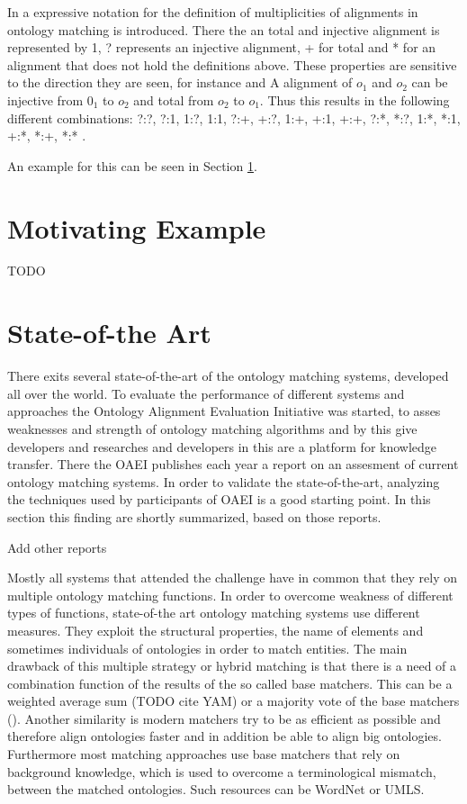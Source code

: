\documentclass[11pt,titlepage,oneside,openany,a4paper]{report}
\begin{document}
In \cite{euzenat2003towards} a expressive notation for the definition of multiplicities of alignments in ontology matching is introduced. There the an total and injective alignment is represented by 1, ? represents an injective alignment, + for total and * for an alignment that does not hold the definitions above. These properties are sensitive to the direction they are seen, for instance and A alignment of $o_1$ and $o_2$ can be injective from $0_1$ to $o_2$ and total from $o_2$ to $o_1$. Thus this results in the following different combinations: ?:?, ?:1, 1:?, 1:1, ?:+, +:?, 1:+, +:1, +:+, ?:*, *:?, 1:*, *:1, +:*, *:+, *:* .

An example for this can be seen in Section \ref{sec:motivating_example}.
\section{Motivating Example}
\label{sec:motivating_example}
TODO
\section{State-of-the Art}
\label{sec:state_of_the_art}
There exits several state-of-the-art of the ontology matching systems, developed all over the world. To evaluate the performance of different systems and approaches the Ontology Alignment Evaluation Initiative was started, to asses weaknesses and strength of ontology matching algorithms and by this give developers and researches and developers in this are a platform for knowledge transfer. \cite{Euzenat:2011aa} 
There the OAEI publishes each year a report on an assesment of current ontology matching systems. In order to validate the state-of-the-art, analyzing the techniques used by participants of OAEI is a good starting point. In this section this finding are shortly summarized, based on those reports. \cite{EuzenatOAEI11} \cite{AguirreOAEI12} \cite{GrauOAEI13}  \cite{euzenat2014}
\begin{Huge}
Add other reports
\end{Huge}

Mostly all systems that attended the challenge have in common that  they rely on multiple ontology matching functions. In order to overcome weakness of different types of functions, state-of-the art ontology matching systems use different measures. They exploit the structural properties, the name of elements and sometimes individuals of ontologies in order to match entities. The main drawback of this multiple strategy or hybrid matching is that there is a need of a combination function of the results of the so called base matchers. This can be a weighted average sum (TODO cite YAM) or a majority vote of the base matchers (\cite{Eckert:2009:IOM:1561533.1561553}). \cite{6104044}
Another similarity is modern matchers try to be as efficient as possible and therefore align ontologies faster and in addition be able to align big ontologies.\cite{Rahm:2011aa}
Furthermore most matching approaches use base matchers that rely on background knowledge, which is used to overcome a terminological mismatch, between the matched ontologies. Such resources can be WordNet \cite{fellbaum1998wordnet} or UMLS\cite{bodenreider2004unified}. \cite{Euzenat:2011aa} 
\end{document}
